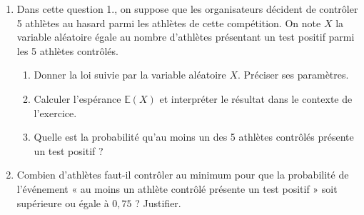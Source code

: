 \begin{enumerate}
	\item Dans cette question 1., on suppose que les organisateurs décident de contrôler 5 athlètes au hasard parmi les athlètes de cette compétition. On note $X$ la variable aléatoire égale au nombre d’athlètes présentant un test positif parmi les 5 athlètes contrôlés. 
	\begin{enumerate}
		\item Donner la loi suivie par la variable aléatoire $X$. Préciser ses paramètres.
		\item Calculer l’espérance $\mathbb{E}(X)$ et interpréter le résultat dans le contexte de l’exercice. 
		\item Quelle est la probabilité qu’au moins un des 5 athlètes contrôlés présente un test positif ? 
	\end{enumerate}
	\item Combien d’athlètes faut-il contrôler au minimum pour que la probabilité de l’événement « au moins un athlète contrôlé présente un test positif » soit supérieure ou égale à $0,75$ ? Justifier.
\end{enumerate} 

